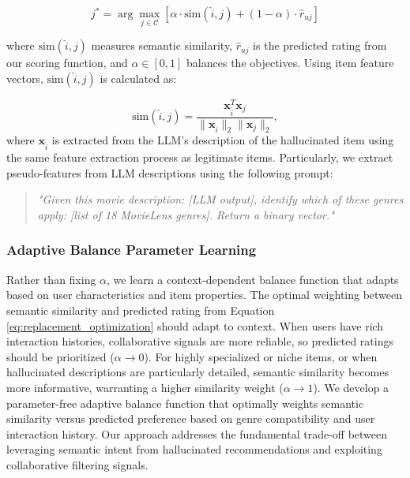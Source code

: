 \documentclass[acmsmall]{acmart}
\begin{document}
\begin{equation}
j^* = \arg\max_{j \in \mathcal{C}} \left[ \alpha \cdot \text{sim}(\hat{i}, j) + (1-\alpha) \cdot \hat{r}_{uj} \right]
\label{eq:replacement_optimization}
\end{equation}

where $\text{sim}(\hat{i}, j)$ measures semantic similarity, $\hat{r}_{uj}$ is the predicted rating from our scoring function, and $\alpha \in [0,1]$ balances the objectives. Using item feature vectors, $\text{sim}(\hat{i}, j)$ is calculated as: 

\begin{equation}
\text{sim}(\hat{i}, j) = \frac{\mathbf{x}_{\hat{i}}^T \mathbf{x}_j}{\|\mathbf{x}_{\hat{i}}\|_2 \|\mathbf{x}_j\|_2},
\label{eq:content_similarity}
\end{equation}
where $\mathbf{x}_{\hat{i}}$ is extracted from the LLM's description of the hallucinated item using the same feature extraction process as legitimate items.
Particularly, we extract pseudo-features from LLM descriptions using the following prompt:
\begin{quote}
\textit{"Given this movie description: [LLM output], identify which of these genres apply: [list of 18 MovieLens genres]. Return a binary vector."}
\end{quote}

\subsubsection{Adaptive Balance Parameter Learning}

Rather than fixing $\alpha$, we learn a context-dependent balance function that adapts based on user characteristics and item properties. The optimal weighting between semantic similarity and predicted rating from Equation \ref{eq:replacement_optimization} should adapt to context. When users have rich interaction histories, collaborative signals are more reliable, so predicted ratings should be prioritized ($\alpha \to 0$). For highly specialized or niche items, or when hallucinated descriptions are particularly detailed, semantic similarity becomes more informative, warranting a higher similarity weight ($\alpha \to 1$).
We develop a parameter-free adaptive balance function that optimally weights semantic similarity versus predicted preference based on genre compatibility and user interaction history. Our approach addresses the fundamental trade-off between leveraging semantic intent from hallucinated recommendations and exploiting collaborative filtering signals.
\end{document}
